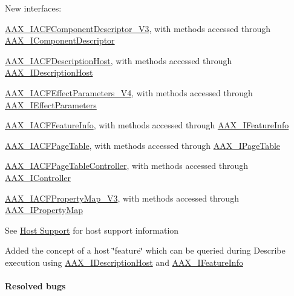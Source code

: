 \begin{DoxyItemize}
\item New interfaces\+: 
\begin{DoxyItemize}
\item \hyperlink{a00052}{A\+A\+X\+\_\+\+I\+A\+C\+F\+Component\+Descriptor\+\_\+\+V3}, with methods accessed through \hyperlink{a00088}{A\+A\+X\+\_\+\+I\+Component\+Descriptor} 
\item \hyperlink{a00056}{A\+A\+X\+\_\+\+I\+A\+C\+F\+Description\+Host}, with methods accessed through \hyperlink{a00091}{A\+A\+X\+\_\+\+I\+Description\+Host} 
\item \hyperlink{a00064}{A\+A\+X\+\_\+\+I\+A\+C\+F\+Effect\+Parameters\+\_\+\+V4}, with methods accessed through \hyperlink{a00099}{A\+A\+X\+\_\+\+I\+Effect\+Parameters} 
\item \hyperlink{a00065}{A\+A\+X\+\_\+\+I\+A\+C\+F\+Feature\+Info}, with methods accessed through \hyperlink{a00100}{A\+A\+X\+\_\+\+I\+Feature\+Info} 
\item \hyperlink{a00074}{A\+A\+X\+\_\+\+I\+A\+C\+F\+Page\+Table}, with methods accessed through \hyperlink{a00107}{A\+A\+X\+\_\+\+I\+Page\+Table} 
\item \hyperlink{a00076}{A\+A\+X\+\_\+\+I\+A\+C\+F\+Page\+Table\+Controller}, with methods accessed through \hyperlink{a00090}{A\+A\+X\+\_\+\+I\+Controller} 
\item \hyperlink{a00081}{A\+A\+X\+\_\+\+I\+A\+C\+F\+Property\+Map\+\_\+\+V3}, with methods accessed through \hyperlink{a00112}{A\+A\+X\+\_\+\+I\+Property\+Map} 
\end{DoxyItemize}See \hyperlink{a00373}{Host Support} for host support information  
\item Added the concept of a host \char`\"{}feature\char`\"{} which can be queried during Describe execution using \hyperlink{a00091}{A\+A\+X\+\_\+\+I\+Description\+Host} and \hyperlink{a00100}{A\+A\+X\+\_\+\+I\+Feature\+Info}  
\end{DoxyItemize}\hypertarget{a00375_aax_sdk_2p3p0_ResolvedBugs}{}\paragraph{Resolved bugs}\label{a00375_aax_sdk_2p3p0_ResolvedBugs}

